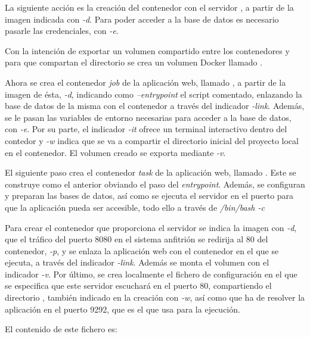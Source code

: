 La siguiente acción es la creación del contenedor  con el servidor , a partir de la imagen  indicada con \textit{\--d}. Para poder acceder a la base de datos es necesario pasarle las credenciales, con \textit{\--e}. 

Con la intención de exportar un volumen compartido entre los contenedores  y  para que compartan el directorio  se crea un volumen Docker llamado .

Ahora se crea el contenedor \textit{job} de la aplicación web, llamado , a partir de la imagen de ésta, \textit{\--d}, indicando como \textit{\---entrypoint} el script comentado, enlazando la base de datos de la misma con el contenedor  a través del indicador \textit{\--link}. Además, se le pasan las variables de entorno necesarias para acceder a la base de datos, con \textit{\--e}. Por su parte, el indicador \textit{\--it} ofrece un terminal interactivo dentro del contedor y \textit{\--w} indica que se va a compartir el directorio inicial del proyecto local en el contenedor. El volumen creado se exporta mediante \textit{\--v}.

El siguiente paso crea el contenedor \textit{task} de la aplicación web, llamado . Este se construye como el anterior obviando el paso del \textit{entrypoint}. Además, se configuran y preparan las bases de datos, así como se ejecuta el servidor  en el puerto  para que la aplicación pueda ser accesible, todo ello a través de \textit{/bin/bash \--c}

Para crear el contenedor  que proporciona el servidor  se indica la imagen con \textit{\--d}, que el tráfico del puerto 8080 en el sistema anfitrión se redirija al 80 del contenedor, \textit{\--p}, y se enlaza la aplicación web con el contenedor en el que se ejecuta, a través del indicador \textit{\--link}. Además se monta el volumen  con el indicador \textit{\--v}. Por último, se crea localmente el fichero de configuración  en el que se especifica que este servidor escuchará en el puerto 80, compartiendo el directorio , también indicado en la creación con \textit{\--w}, así como que ha de resolver la aplicación en el puerto 9292, que es el que usa  para la ejecución.  

El contenido de este fichero es: 
\begin{codelisting}
\label{code:nginxconf}
\end{codelisting}

